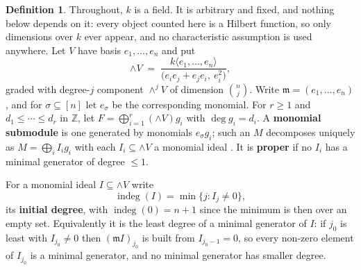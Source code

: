 \documentclass[11pt, a4paper, abstract=yes]{scrartcl}
\theoremstyle{definition}
\newtheorem{definition}{Definition}
\theoremstyle{remark}
\theoremstyle{plain}
\newcommand{\indeg}{\operatorname{indeg}}
\newcommand{\Ext}{\mathord{\wedge }V}
\begin{document}
\begin{definition}
Throughout, \(k\) is a field. It is arbitrary and fixed, and nothing below depends on it: every
object counted here is a Hilbert function, so only dimensions over \(k\) ever appear, and no
characteristic assumption is used anywhere. Let \(V\) have basis \(e_1,\dots,e_n\) and put
\begin{equation}\label{eq:def-ext}
  \Ext\;=\;\frac{k\langle e_1,\dots,e_n\rangle}{\bigl(e_ie_j+e_je_i,\ e_i^2\bigr)},
\end{equation}
graded with degree-\(j\) component \(\wedge^jV\) of dimension \(\binom nj\). Write
\(\mathfrak m=(e_1,\dots,e_n)\), and for \(\sigma\subseteq[n]\) let \(e_\sigma\) be the corresponding
monomial. For \(r\ge1\) and \(d_1\le\cdots\le d_r\) in \(\mathbb Z\), let
\(F=\bigoplus_{i=1}^r(\Ext)g_i\) with \(\deg g_i=d_i\). A \textbf{monomial submodule} is one generated by
monomials \(e_\sigma g_i\); such an \(M\) decomposes uniquely as \(M=\bigoplus_iI_ig_i\) with each
\(I_i\subseteq \Ext\) a monomial ideal \autocite[Definition 2.1]{AmataCrupi2020}. It is \textbf{proper} if no \(I_i\) has
a minimal generator of degree \(\le1\).

For a monomial ideal \(I\subseteq \Ext\) write
\begin{equation}\label{eq:indeg-ideal}
  \indeg(I)=\min\lbrace j:I_j\ne0\rbrace ,
\end{equation}
its \textbf{initial degree}, with \(\indeg(0)=n+1\) since the minimum is then over an empty set.
Equivalently it is the least degree of a minimal generator of \(I\): if \(j_0\) is least with
\(I_{j_0}\ne0\) then \((\mathfrak mI)_{j_0}\) is built from \(I_{j_0-1}=0\), so every non-zero
element of \(I_{j_0}\) is a minimal generator, and no minimal generator has smaller degree.
\label{def-setup}
\end{definition}
\end{document}
